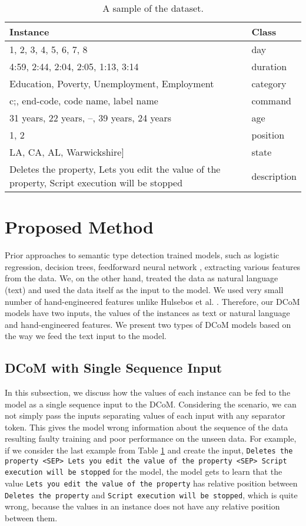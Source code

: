 \documentclass{article}
\begin{document}
\begin{table}[ht]
	\centering
	\begin{tabular}{ll}
		\hline
		\textbf{Instance}  & \textbf{Class} \\ \hline
		1, 2, 3, 4, 5, 6, 7, 8 & day \\
		4:59, 2:44, 2:04, 2:05, 1:13, 3:14 & duration \\ 
		Education, Poverty, Unemployment, Employment & category \\ 
		c;, end-code, code name, label name & command \\ 
		31 years, 22 years, --, 39 years, 24 years & age \\ 
		1, 2 & position \\ 
		LA, CA, AL, Warwickshire] & state \\
		Deletes the property, Lets you edit the value of the property, Script execution will be stopped & description \\ \hline
		
	\end{tabular}
	\caption{A sample of the dataset.}
	\label{tab:sample_data}
\end{table}

\section{Proposed  Method}
\label{sec:method}
Prior approaches \cite{Venetis, Limaye} to semantic type detection trained models, such as logistic regression, decision trees, feedforward neural network \cite{Hulsebos}, extracting various features from the data. We, on the other hand, treated the data as natural language (text) and used the data itself as the input to the model. We used very small  number of hand-engineered features unlike Hulsebos et al. \cite{Hulsebos}. Therefore, our DCoM models have two inputs, the values of the instances as text or natural language and hand-engineered features. We present two types of DCoM models based on the way we feed the text input to the model.

\subsection{DCoM with Single Sequence Input}
In this subsection, we discuss how the values of each instance can be fed to the model as a single sequence input to the DCoM. Considering the scenario, we can not simply pass the inputs separating values of each input with any separator token. This gives the model wrong information about the sequence of the data resulting faulty training and poor performance on the unseen data. For example, if we consider the last example from Table \ref{tab:sample_data} and create the input, \texttt{Deletes the property <SEP> Lets you edit the value of the property <SEP> Script execution will be stopped} for the model, the model gets to learn that the value \texttt{Lets you edit the value of the property} has relative position between \texttt{Deletes the property} and \texttt{Script execution will be stopped}, which is quite wrong, because the values in an instance does not have any relative position between them. 
\end{document}
